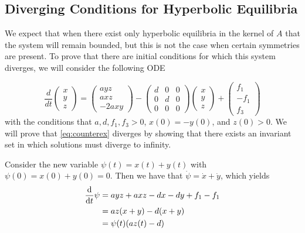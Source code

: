 \documentclass[11pt]{article}
\begin{document}
\subsection{Diverging Conditions for Hyperbolic Equilibria}

We expect that when there exist only hyperbolic equilibria in the kernel of $A$ that the system will remain bounded, but this is not the case when certain symmetries are present. To prove that there are initial conditions for which this system diverges, we will consider the following ODE

\begin{equation}\label{eq:counterex}
    \frac{d}{dt} \begin{pmatrix} x \\ y \\ z 
    \end{pmatrix} = \begin{pmatrix}
        ayz\\
        axz\\
        -2axy
    \end{pmatrix} - \begin{pmatrix}
        d & 0 & 0 \\
        0 & d & 0 \\ 
        0 & 0 & 0 
    \end{pmatrix} \begin{pmatrix} x \\ y \\ z 
    \end{pmatrix} 
    + 
    \begin{pmatrix} f_1 \\ -f_1 \\ f_3
    \end{pmatrix}
\end{equation}
with the conditions that $a, d, f_1, f_3 > 0$, $x(0) = -y(0)$, and $z(0) > 0$. We will prove that \eqref{eq:counterex} diverges by showing that there exists an invariant set in which solutions must diverge to infinity. 

Consider the new variable $\psi (t) = x(t) + y(t)$ with $\psi(0) = x(0) + y(0) = 0$. Then we have that $\dot{\psi} = \dot{x} + \dot{y}$, which yields \begin{align*}
    \dv{}{t}\psi &= ayz + axz -dx - dy + f_1 - f_1\\
    &= az(x + y) - d(x + y)\\
    &= \psi(t)(az(t) - d)
\end{align*}
\end{document}
